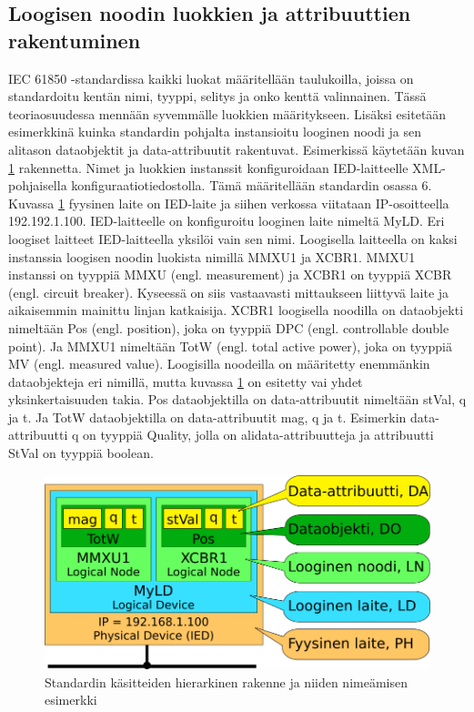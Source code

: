 \subsection{Loogisen noodin luokkien ja attribuuttien rakentuminen}
\label{ch:luokkien-rakentuminen-instanseista}
IEC 61850 -standardissa kaikki luokat määritellään taulukoilla, joissa on standardoitu kentän nimi, tyyppi, selitys ja onko kenttä valinnainen. Tässä teoriaosuudessa mennään syvemmälle luokkien määritykseen. Lisäksi esitetään esimerkkinä kuinka standardin pohjalta instansioitu looginen noodi ja sen alitason dataobjektit ja data-attribuutit rakentuvat. Esimerkissä käytetään kuvan \ref{fig:iec61850-data-modeling} rakennetta. Nimet ja luokkien instanssit konfiguroidaan IED-laitteelle XML-pohjaisella konfiguraatiotiedostolla. Tämä määritellään standardin osassa 6. Kuvassa \ref{fig:iec61850-data-modeling} fyysinen laite on IED-laite ja siihen verkossa viitataan IP-osoitteella 192.192.1.100. IED-laitteelle on konfiguroitu looginen laite nimeltä MyLD. Eri loogiset laitteet IED-laitteella yksilöi vain sen nimi. Loogisella laitteella on kaksi instanssia loogisen noodin luokista nimillä MMXU1 ja XCBR1. MMXU1 instanssi on tyyppiä MMXU (engl. measurement) \cite[s.~57--58]{IEC61850-7-4} ja XCBR1 on tyyppiä XCBR (engl. circuit breaker). Kyseessä on siis vastaavasti mittaukseen liittyvä laite ja aikaisemmin mainittu linjan katkaisija. XCBR1 loogisella noodilla on dataobjekti nimeltään Pos (engl. position), joka on tyyppiä DPC (engl. controllable double point). Ja MMXU1 nimeltään TotW (engl. total active power), joka on tyyppiä MV (engl. measured value). Loogisilla noodeilla on määritetty enemmänkin dataobjekteja eri nimillä, mutta kuvassa \ref{fig:iec61850-data-modeling} on esitetty vai yhdet yksinkertaisuuden takia. Pos dataobjektilla on data-attribuutit nimeltään stVal, q ja t. Ja TotW dataobjektilla on data-attribuutit mag, q ja t. Esimerkin data-attribuutti q on tyyppiä Quality, jolla on alidata-attribuutteja ja attribuutti StVal on tyyppiä boolean.

\begin{figure}[ht!]
	\includegraphics[width=1\textwidth]{pictures/iec61850-data-modeling.png}
	\caption{Standardin käsitteiden hierarkinen rakenne ja niiden nimeämisen esimerkki}
	\label{fig:iec61850-data-modeling}
\end{figure}

